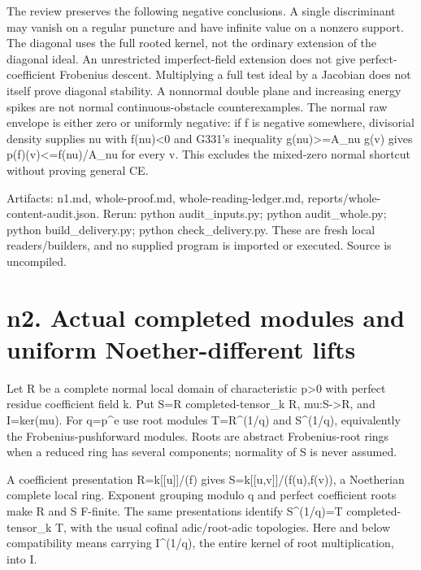 \documentclass[11pt]{article}
\begin{document}
The review preserves the following negative conclusions. A single discriminant may vanish on a regular puncture and have infinite value on a nonzero support. The diagonal uses the full rooted kernel, not the ordinary extension of the diagonal ideal. An unrestricted imperfect-field extension does not give perfect-coefficient Frobenius descent. Multiplying a full test ideal by a Jacobian does not itself prove diagonal stability. A nonnormal double plane and increasing energy spikes are not normal continuous-obstacle counterexamples. The normal raw envelope is either zero or uniformly negative: if f is negative somewhere, divisorial density supplies nu with f(nu)<0 and G331's inequality g(nu)>=A\_nu g(v) gives p(f)(v)<=f(nu)/A\_nu for every v. This excludes the mixed-zero normal shortcut without proving general CE.

Artifacts: n1.md, whole-proof.md, whole-reading-ledger.md, reports/whole-content-audit.json. Rerun: python audit\_inputs.py; python audit\_whole.py; python build\_delivery.py; python check\_delivery.py. These are fresh local readers/builders, and no supplied program is imported or executed. Source is uncompiled.

\section{n2. Actual completed modules and uniform Noether-different lifts}

Let R be a complete normal local domain of characteristic p>0 with perfect residue coefficient field k. Put S=R completed-tensor\_k R, mu:S->R, and I=ker(mu). For q=p\textasciicircum{}e use root modules T=R\textasciicircum{}(1/q) and S\textasciicircum{}(1/q), equivalently the Frobenius-pushforward modules. Roots are abstract Frobenius-root rings when a reduced ring has several components; normality of S is never assumed.

A coefficient presentation R=k[[u]]/(f) gives S=k[[u,v]]/(f(u),f(v)), a Noetherian complete local ring. Exponent grouping modulo q and perfect coefficient roots make R and S F-finite. The same presentations identify S\textasciicircum{}(1/q)=T completed-tensor\_k T, with the usual cofinal adic/root-adic topologies. Here and below compatibility means carrying I\textasciicircum{}(1/q), the entire kernel of root multiplication, into I.
\end{document}
